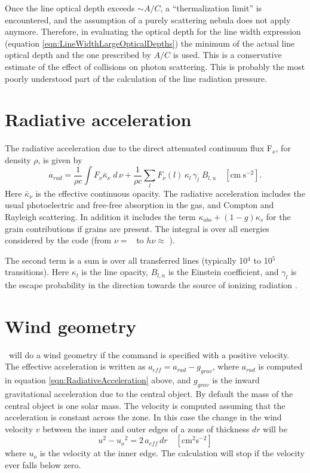 Once the line optical depth exceeds $\sim A/C$, a ``thermalization limit''
is encountered, and the assumption of a purely scattering nebula does not
apply anymore.  Therefore, in evaluating the optical depth for the line
width expression (equation \ref{eqn:LineWidthLargeOpticalDepths}) the minimum of the actual line optical depth
and the one prescribed by $A/C$ is used. This is a conservative estimate of
the effect of collisions on photon scattering.  This is probably the most
poorly understood part of the calculation of the line radiation pressure.

\section{Radiative acceleration}

The radiative acceleration due to the direct attenuated continuum flux
F$_\nu$, for density $\rho$, is given by
\begin{equation}
\label{eqn:RadiativeAcceleration}
{a_{rad}} = \frac{1}{{\rho c}}\int {{F_\nu }{{\bar \kappa }_\nu }\;d\,\nu
+ } \frac{1}{{\rho c}}\sum\limits_l {{F_\nu }(l)\,{\kappa _l}\,{\gamma _l}}
\;{B_{l,u}}
\quad  [\mathrm{cm~s}^{-2}].
\end{equation}
Here ${\bar \kappa _\nu }$
is the effective continuous opacity.  The radiative acceleration includes
the usual photoelectric and free-free absorption in the gas, and Compton
and Rayleigh scattering.  In addition it includes the term $\kappa_{abs} +
(1-g)\kappa_s$
for the grain contributions if grains are present.  The integral is over
all energies considered by the code (from $\nu =$ \emmmhz\ to $h\nu
\approx$ \egamrymev).

The second term is a sum is over all transferred lines (typically 10$^4$
to 10$^5$ transitions).  Here $\kappa_l$ is the line opacity, $B_{l,n}$ is the Einstein
coefficient, and $\gamma_l$ is the escape probability in the direction towards the
source of ionizing radiation \citep{Ferland1988}.

\section{Wind geometry}

\Cloudy\ will do a wind geometry if the  command
is specified with a positive velocity.  The effective acceleration is written
as $a_{eff} = a_{rad} - g_{grav}$, where $a_{rad}$ is computed in equation
\ref{eqn:RadiativeAcceleration} above, and
$g_{grav}$ is the inward gravitational acceleration due to the central object.
By default the mass of the central object is one solar mass.  The velocity
is computed assuming that the acceleration is constant across the zone.
In this case the change in the wind velocity $v$ between the inner and outer
edges of a zone of thickness $dr$ will be
\begin{equation}
{u^2} - {u_o}^2 = 2\,{a_{eff}}\,dr
\quad [\mathrm{cm}^2 \mathrm{s}^{-2}]
\end{equation}
where $u_o$ is the velocity at the inner edge.  The calculation will stop if
the velocity ever falls below zero.

